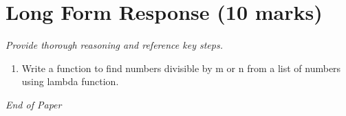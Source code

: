 \documentclass[12pt]{article}
\begin{document}
\section*{Long Form Response (10 marks)}
\textit{Provide thorough reasoning and reference key steps.}
\begin{enumerate}[label=\arabic*.]
\item Write a function to find numbers divisible by m or n from a list of numbers using lambda
function.
\end{enumerate}

\vfill
\noindent\textit{End of Paper}
\end{document}
